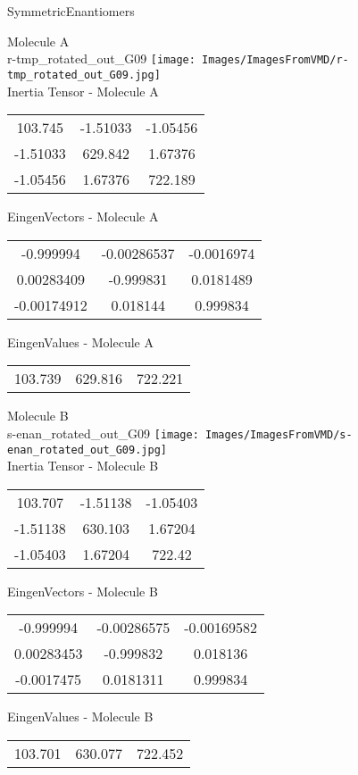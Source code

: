 \vtab[-2cm]
\begin{center}
{\large SymmetricEnantiomers}
\end{center}
\begin{multicols}{2}
\begin{center}
Molecule A \\ 
r-tmp\_rotated\_out\_G09
\texttt{[image: Images/ImagesFromVMD/r-tmp\_rotated\_out\_G09.jpg]}
\\
Inertia Tensor - Molecule A \\
\vtab
\begin{tabular}{|c c c|}
103.745	 & 	-1.51033	 & 	-1.05456	 \\
-1.51033	 & 	629.842	 & 	1.67376	 \\
-1.05456	 & 	1.67376	 & 	722.189
\end{tabular}

\vtab
 EingenVectors - Molecule A     \\
\vtab
\begin{tabular}{|c c c|}
-0.999994	 & 	-0.00286537	 & 	-0.0016974	 \\
0.00283409	 & 	-0.999831	 & 	0.0181489	 \\
-0.00174912	 & 	0.018144	 & 	0.999834
\end{tabular}

\vtab
 EingenValues - Molecule A     \\
\vtab
\begin{tabular}{|c c c|}
103.739	 & 	629.816	 & 	722.221
\end{tabular}
\columnbreak

Molecule B \\ 
s-enan\_rotated\_out\_G09
\texttt{[image: Images/ImagesFromVMD/s-enan\_rotated\_out\_G09.jpg]}
\\
Inertia Tensor - Molecule B \\
\vtab
\begin{tabular}{|c c c|}
103.707	 & 	-1.51138	 & 	-1.05403	 \\
-1.51138	 & 	630.103	 & 	1.67204	 \\
-1.05403	 & 	1.67204	 & 	722.42
\end{tabular}

\vtab
 EingenVectors - Molecule B     \\
\vtab
\begin{tabular}{|c c c|}
-0.999994	 & 	-0.00286575	 & 	-0.00169582	 \\
0.00283453	 & 	-0.999832	 & 	0.018136	 \\
-0.0017475	 & 	0.0181311	 & 	0.999834
\end{tabular}

\vtab
 EingenValues - Molecule B     \\
\vtab
\begin{tabular}{|c c c|}
103.701	 & 	630.077	 & 	722.452
\end{tabular}

\end{center}
\end{multicols}
